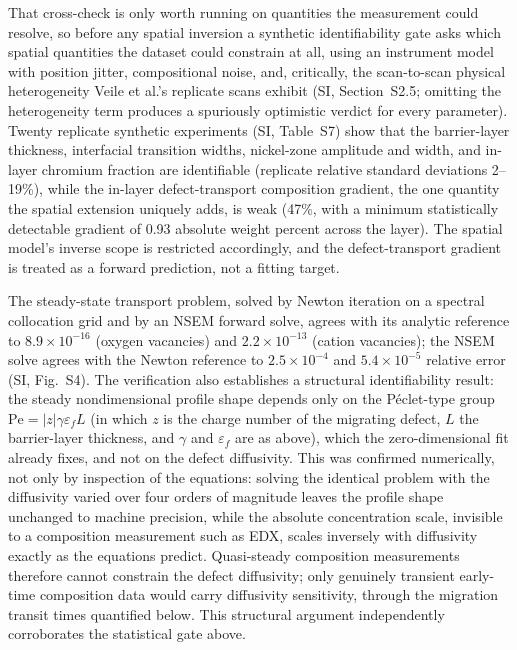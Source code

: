 \documentclass[pdflatex,sn-nature]{sn-jnl}
\begin{document}
That cross-check is only worth running on quantities the measurement
could resolve, so before any spatial inversion a synthetic
identifiability gate asks which spatial quantities the dataset could
constrain at all, using an
instrument model with position jitter, compositional noise, and,
critically, the scan-to-scan physical heterogeneity Veile et al.'s
replicate scans exhibit (SI, Section~S2.5; omitting the heterogeneity
term produces a spuriously optimistic verdict for every parameter).
Twenty replicate synthetic experiments (SI, Table~S7) show that
the barrier-layer thickness, interfacial transition widths, nickel-zone
amplitude and width, and in-layer chromium fraction are identifiable
(replicate relative standard deviations 2--19\%), while the in-layer
defect-transport composition gradient, the one quantity the spatial
extension uniquely adds, is weak (47\%, with a minimum statistically
detectable gradient of 0.93 absolute weight percent across the layer).
The spatial model's inverse scope is restricted accordingly, and the
defect-transport gradient is treated as a forward prediction, not a
fitting target.

The steady-state transport problem, solved by Newton iteration on a
spectral collocation grid and by an NSEM forward solve, agrees with its
analytic reference to $8.9\times10^{-16}$ (oxygen vacancies) and
$2.2\times10^{-13}$ (cation vacancies); the NSEM solve agrees with the
Newton reference to $2.5\times10^{-4}$ and $5.4\times10^{-5}$ relative
error (SI, Fig.~S4). The verification also establishes a
structural identifiability result: the steady nondimensional profile
shape depends only on the P\'eclet-type group
$\mathrm{Pe} = |z|\gamma \varepsilon_f L$ (in which $z$ is the charge
number of the migrating defect, $L$ the barrier-layer thickness, and
$\gamma$ and $\varepsilon_f$ are as above), which the zero-dimensional
fit already fixes, and not on the defect diffusivity. This was confirmed numerically,
not only by inspection of the equations: solving the identical problem
with the diffusivity varied over four orders of magnitude leaves the
profile shape unchanged to machine precision, while the absolute
concentration scale, invisible to a composition measurement such as
EDX, scales inversely with diffusivity exactly as the equations
predict. Quasi-steady composition measurements therefore cannot
constrain the defect diffusivity; only genuinely transient early-time
composition data would carry diffusivity sensitivity, through the
migration transit times quantified below. This structural argument
independently corroborates the statistical gate above.
\end{document}
